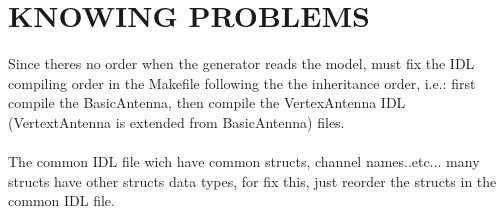 \newpage
\section{KNOWING PROBLEMS}

Since theres no order when the generator reads the model, must fix the IDL
compiling order in the Makefile following the the inheritance order,
i.e.: first compile the BasicAntenna, then compile the VertexAntenna IDL
(VertextAntenna is extended from BasicAntenna) files.\\
\\
The common IDL file wich have common structs, channel names..etc... many
structs have other structs data types, for fix this, just reorder the structs in the
common IDL file.
